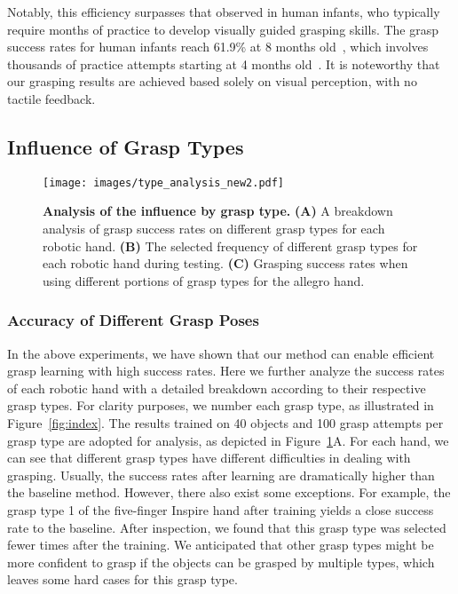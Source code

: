 Notably, this efficiency surpasses that observed in human infants, who typically require months of practice to develop visually guided grasping skills. The grasp success rates for human infants reach 61.9\% at 8 months old~\cite{domellof2015infant}, which involves thousands of practice attempts starting at 4 months old~\cite{newell1989task}. It is noteworthy that our grasping results are achieved based solely on visual perception, with no tactile feedback.

\subsection{Influence of Grasp Types}


\begin{figure}
    \centering
    \texttt{[image: images/type\_analysis\_new2.pdf]}
    \caption{\textbf{Analysis of the influence by grasp type.} \textbf{(A)} A breakdown analysis of grasp success rates on different grasp types for each robotic hand. \textbf{(B)} The selected frequency of different grasp types for each robotic hand during testing. \textbf{(C)} Grasping success rates when using different portions of grasp types for the allegro hand.}
    \label{fig:grasp_type}
\end{figure}

\subsubsection*{Accuracy of Different Grasp Poses}

In the above experiments, we have shown that our method can enable efficient grasp learning with high success rates. Here we further analyze the success rates of each robotic hand with a detailed breakdown according to their respective grasp types. For clarity purposes, we number each grasp type, as illustrated in Figure~\ref{fig:index}. The results trained on 40 objects and 100 grasp attempts per grasp type are adopted for analysis, as depicted in Figure~\ref{fig:grasp_type}A. For each hand, we can see that different grasp types have different difficulties in dealing with grasping. Usually, the success rates after learning are dramatically higher than the baseline method. However, there also exist some exceptions. For example, the grasp type 1 of the five-finger Inspire hand after training yields a close success rate to the baseline. After inspection, we found that this grasp type was selected fewer times after the training. We anticipated that other grasp types might be more confident to grasp if the objects can be grasped by multiple types, which leaves some hard cases for this grasp type.

